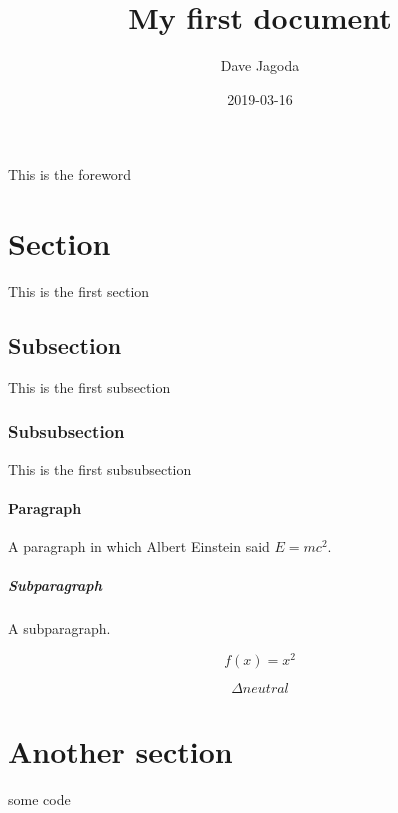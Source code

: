 \documentclass{article}
\title{My first document}
\author{Dave Jagoda}
\date{2019-03-16}
\begin{document}
\maketitle
{}

\newpage
{}
This is the foreword

\newpage
{}

\section{Section}

This is the first section

\subsection{Subsection}

This is the first subsection

\subsubsection{Subsubsection}

This is the first subsubsection

\paragraph{Paragraph}

A paragraph in which Albert Einstein said $E = mc^2$.

\subparagraph{Subparagraph}

A subparagraph.

\begin{equation*}
  f(x) = x^2
\end{equation*}

\begin{equation*}
  \Delta neutral
\end{equation*}

\section{Another section}

some code


\end{document}
